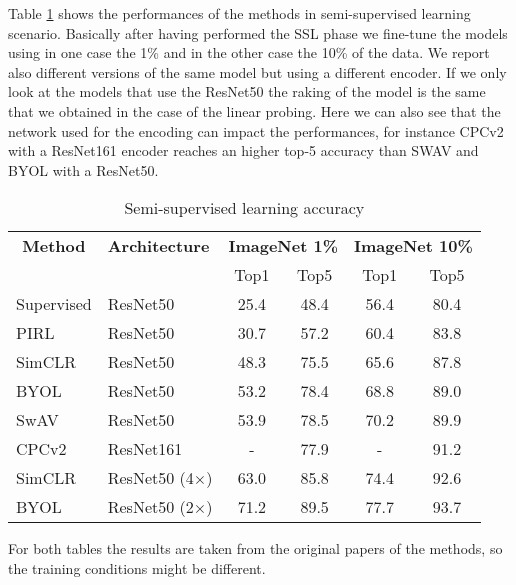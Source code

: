Table \ref{tab:imagenet-1-perc-semisup} shows the performances of the methods in semi-supervised learning scenario. Basically after having performed the SSL phase we fine-tune the models using in one case the 1\% and in the other case the 10\% of the data. We report also different versions of the same model but using a different encoder. If we only look at the models that use the ResNet50 the raking of the model is the same that we obtained in the case of the linear probing. Here we can also see that the network used for the encoding can impact the performances, for instance CPCv2 with a ResNet161 encoder reaches an higher top-5 accuracy than SWAV and BYOL with a ResNet50.
\begin{table}[H]
	\centering
	\begin{tabular}{|l|l|cc|cc|}
		\hline
		\multicolumn{1}{|c|}{\textbf{Method}} & \textbf{Architecture} & \multicolumn{2}{c|}{\textbf{ImageNet 1\%}} & \multicolumn{2}{c|}{\textbf{ImageNet 10\%}} \\
		\multicolumn{1}{|c|}{} &  & Top1 & Top5 & Top1 & Top5  \\
		\hline
		Supervised & ResNet50 & 25.4 & 48.4 & 56.4 & 80.4 \\
		PIRL & ResNet50 & 30.7 & 57.2  & 60.4 & 83.8 \\
		SimCLR & ResNet50 & 48.3 & 75.5  & 65.6 & 87.8 \\
		BYOL & ResNet50  & 53.2 & 78.4  & 68.8 & 89.0 \\ 
		SwAV & ResNet50 & 53.9 & 78.5  & 70.2 & 89.9 \\
		CPCv2 & ResNet161 & - & 77.9 & - & 91.2 \\
		SimCLR & ResNet50 (4$\times$) & 63.0 & 85.8 & 74.4 & 92.6 \\
		BYOL & ResNet50 (2$\times$) & 71.2 & 89.5 & 77.7 & 93.7 \\
		\hline
	\end{tabular}
	\caption{Semi-supervised learning accuracy}
	\label{tab:imagenet-1-perc-semisup}
\end{table}
For both tables the results are taken from the original papers of the methods, so the training conditions might be different.

